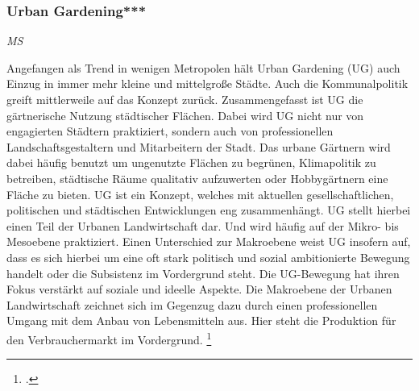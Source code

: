 \documentclass{scrartcl}
\begin{document}
\subsubsection{Urban Gardening***}\textit{MS}

Angefangen als Trend in wenigen Metropolen hält Urban Gardening (UG) auch Einzug in immer mehr kleine und mittelgroße Städte. Auch die Kommunalpolitik greift mittlerweile auf das Konzept zurück. Zusammengefasst ist UG die gärtnerische Nutzung städtischer Flächen. Dabei wird UG nicht nur von engagierten Städtern praktiziert,
sondern auch von professionellen Landschaftsgestaltern und Mitarbeitern der Stadt. Das urbane Gärtnern wird dabei häufig benutzt um ungenutzte Flächen zu begrünen, Klimapolitik zu betreiben, städtische Räume qualitativ aufzuwerten oder Hobbygärtnern eine Fläche zu bieten. UG ist ein Konzept, welches mit aktuellen gesellschaftlichen, politischen und städtischen Entwicklungen eng zusammenhängt.
UG stellt hierbei einen Teil der Urbanen Landwirtschaft dar. Und wird häufig auf der Mikro- bis Mesoebene praktiziert. Einen Unterschied zur Makroebene weist UG insofern auf, dass es sich hierbei um eine oft stark politisch und sozial ambitionierte Bewegung handelt oder die Subsistenz im Vordergrund steht. Die UG-Bewegung hat ihren Fokus verstärkt auf soziale und ideelle Aspekte. Die Makroebene der Urbanen Landwirtschaft zeichnet sich im Gegenzug dazu durch einen professionellen Umgang mit dem Anbau von Lebensmitteln aus. Hier steht die Produktion für den Verbrauchermarkt im Vordergrund. \footcite[S.27]{}
\end{document}
